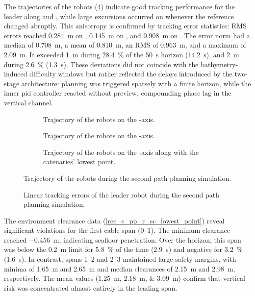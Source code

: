 The trajectories of the robots (\cref{rcc_s_pp_r_sc_poses}) indicate good tracking performance for
the leader along  and , while large excursions occurred on 
whenever the reference changed abruptly. This anisotropy is confirmed by tracking error statistics:
RMS errors reached \qty{0.284}{\m} on , \qty{0.145}{\m} on , and
\qty{0.908}{\m} on . The error norm had a median of \qty{0.708}{\m}, a mean of
\qty{0.810}{\m}, an RMS of \qty{0.963}{\m}, and a maximum of \qty{2.09}{\m}. It exceeded
\qty{1}{\m} during \qty{28.4}{\percent} of the \qty{50}{\s} horizon (\qty{14.2}{\s}), and
\qty{2}{\m} during \qty{2.6}{\percent} (\qty{1.3}{\s}). These deviations did not coincide with the
bathymetry-induced difficulty windows but rather reflected the delays introduced by the two-stage
architecture: planning was triggered sparsely with a finite horizon, while the inner \ac{pid}
controller reacted without preview, compounding phase lag in the vertical channel.

\begin{figure}
	\centering
	\begin{subfigure}{\figurewidth}
		\centering
		\caption{Trajectory of the robots on the -axis.}
		\label{rcc_s_pp_r_sc_pose_x}
	\end{subfigure}
	\begin{subfigure}{\figurewidth}
		\centering
		\caption{Trajectory of the robots on the -axis.}
		\label{rcc_s_pp_r_sc_pose_y}
	\end{subfigure}
	\begin{subfigure}{\figurewidth}
		\centering
		\caption{Trajectory of the robots on the -axis along with the catenaries' lowest point.}
		\label{rcc_s_pp_r_sc_pose_z}
	\end{subfigure}
	\caption{Trajectory of the robots during the second path planning simulation.}
	\label{rcc_s_pp_r_sc_poses}
\end{figure}

\begin{figure}
	\centering
	\caption{Linear tracking errors of the leader robot during the second path planning simulation.}
	\label{rcc_s_pp_r_sc_error}
\end{figure}

The environment clearance data (\cref{rcc_s_pp_r_sc_lowest_point}) reveal significant violations
for the first cable span (0--1). The minimum clearance reached \qty{-0.456}{\m}, indicating
seafloor penetration. Over the horizon, this span was below the \qty{0.2}{\m} limit for
\qty{5.8}{\percent} of the time (\qty{2.9}{\s}) and negative for \qty{3.2}{\percent}
(\qty{1.6}{\s}). In contrast, spans 1--2 and 2--3 maintained large safety margins, with minima of
\qty{1.65}{\m} and \qty{2.65}{\m} and median clearances of \qty{2.15}{\m} and \qty{2.98}{\m},
respectively. The mean values (\qtylist{1.25;2.18;3.09}{\m}) confirm that vertical risk was
concentrated almost entirely in the leading span.

